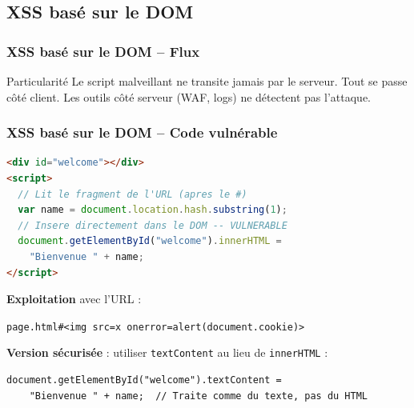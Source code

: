 \documentclass{beamer}
\def\emptyline{\vspace{10pt}}
\newcommand{\circled}[1]{\raisebox{.5pt}{\textcircled{\raisebox{-.9pt}{\scriptsize #1}}}}
\begin{document}
\subsection{XSS basé sur le DOM}

\begin{frame}
\frametitle{XSS basé sur le DOM -- Flux}

\begin{center}
\end{center}

\begin{alertblock}{Particularité}
Le script malveillant \alert{ne transite jamais par le serveur}. Tout se passe côté client. Les outils côté serveur (WAF, logs) ne détectent pas l'attaque.
\end{alertblock}
\end{frame}


\begin{frame}[fragile]
\frametitle{XSS basé sur le DOM -- Code vulnérable}

\begin{lstlisting}[language=HTML,title={\texttt{Page vulnérable utilisant innerHTML}}]
<div id="welcome"></div>
<script>
  // Lit le fragment de l'URL (apres le #)
  var name = document.location.hash.substring(1);
  // Insere directement dans le DOM -- VULNERABLE
  document.getElementById("welcome").innerHTML =
    "Bienvenue " + name;
</script>
\end{lstlisting}

\textbf{Exploitation} avec l'URL :
\begin{center}
\texttt{page.html\#<img src=x onerror=alert(document.cookie)>}
\end{center}

\emptyline
\textbf{Version sécurisée} : utiliser \texttt{textContent} au lieu de \texttt{innerHTML} :
\begin{lstlisting}[language=HTML,title={\texttt{Correction}}]
document.getElementById("welcome").textContent =
    "Bienvenue " + name;  // Traite comme du texte, pas du HTML
\end{lstlisting}
\end{frame}
\end{document}
